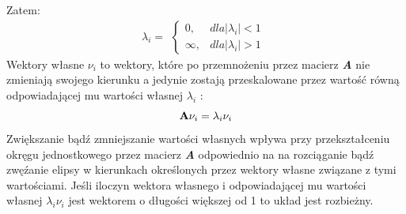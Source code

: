 \documentclass{article}
\begin{document}
Zatem:
\[
\lambda_i = 
\begin{aligned}
\begin{cases}
0, &dla  |\lambda_i| < 1 \\ 
\infty, &dla |\lambda_i| > 1
\end{cases}
\end{aligned}
\]
Wektory własne $\nu_i$ to wektory, które po przemnożeniu przez macierz \textit{\textbf{A}} nie zmieniają swojego kierunku a jedynie zostają przeskalowane przez warto\'sć równą odpowiadającej mu warto\'sci własnej $\lambda_i$ :
\[ \bold{A}\nu_i = \lambda_i \nu_i \]
Zwiększanie bądź zmniejszanie warto\'sci własnych wpływa przy przekształceniu okręgu jednostkowego przez macierz \textit{\textbf{A}} odpowiednio na na rozciąganie bądź zwęźanie elipsy w kierunkach okre\'slonych przez wektory własne związane z tymi warto\'sciami. Je\'sli iloczyn wektora własnego i odpowiadającej mu warto\'sci własnej $\lambda_i\nu_i$  jest wektorem o długo\'sci większej od 1 to układ jest rozbieżny.
\end{document}
